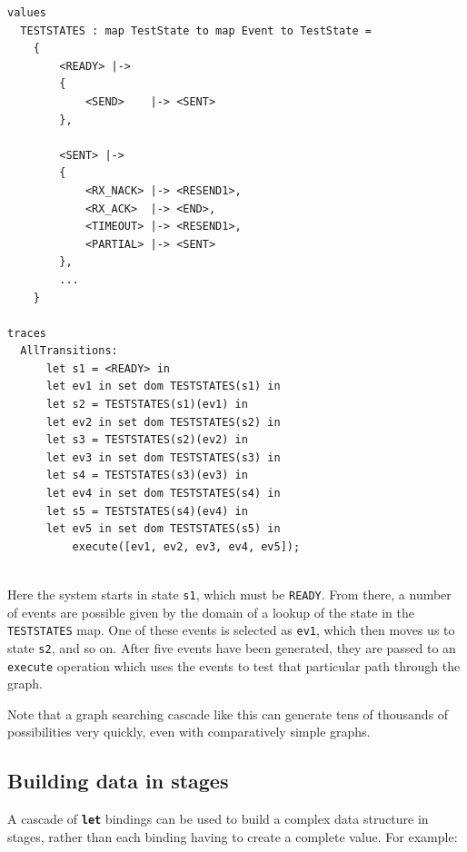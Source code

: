 \documentclass{overturerepchap}
\begin{document}
\scriptsize
\begin{lstlisting}
values
  TESTSTATES : map TestState to map Event to TestState =
    {
        <READY> |->
        {
            <SEND>    |-> <SENT>
        },

        <SENT> |->
        {
            <RX_NACK> |-> <RESEND1>,
            <RX_ACK>  |-> <END>,
            <TIMEOUT> |-> <RESEND1>,
            <PARTIAL> |-> <SENT>
        },
        ...
    }

traces
  AllTransitions:
      let s1 = <READY> in
      let ev1 in set dom TESTSTATES(s1) in
      let s2 = TESTSTATES(s1)(ev1) in
      let ev2 in set dom TESTSTATES(s2) in
      let s3 = TESTSTATES(s2)(ev2) in
      let ev3 in set dom TESTSTATES(s3) in
      let s4 = TESTSTATES(s3)(ev3) in
      let ev4 in set dom TESTSTATES(s4) in
      let s5 = TESTSTATES(s4)(ev4) in
      let ev5 in set dom TESTSTATES(s5) in
          execute([ev1, ev2, ev3, ev4, ev5]);
 
\end{lstlisting}
\normalsize

\noindent Here the system starts in state \texttt{s1}, which must be \texttt{READY}. From
there, a number of events are possible given by the domain of a lookup of the
state in the \texttt{TESTSTATES} map. One of these events is selected as
\texttt{ev1}, which then moves us to state \texttt{s2}, and so on. After five
events have been generated, they are passed to an \texttt{execute} operation which
uses the events to test that particular path through the graph.

Note that a graph searching cascade like this can generate tens of thousands of
possibilities very quickly, even with comparatively simple graphs.

\subsection{Building data in stages}

A cascade of \texttt{\textbf{let}} bindings can be used to build a complex data
structure in stages, rather than each binding having to create a complete value. For example:
\end{document}
